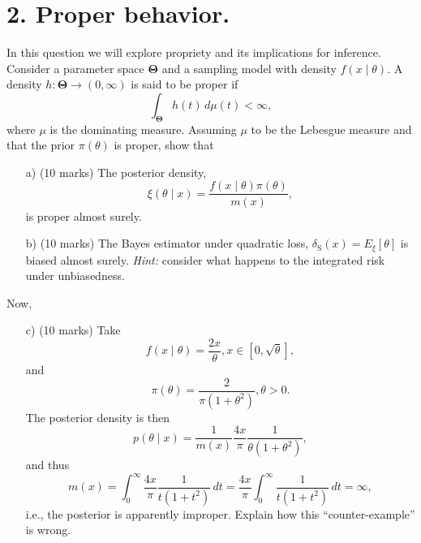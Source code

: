 \documentclass[a4paper,10pt, notitlepage]{report}
\begin{document}
\section*{2. Proper behavior.}

In this question we will explore propriety and its implications for inference.
Consider a parameter space $\boldsymbol{\Theta}$ and a sampling model with density $f(x \mid \theta)$.
A density $h : \boldsymbol{\Theta} \to (0, \infty)$ is said to be proper if 
\begin{equation*}
 \int_{\boldsymbol{\Theta}} h(t)\,d\mu(t)  < \infty,
\end{equation*}
where $\mu$ is the dominating measure.
Assuming $\mu$ to be the Lebesgue measure and that the prior $\pi(\theta)$ is proper, show that
\begin{itemize}
 \item[a)] (10 marks) The posterior density,
 \begin{equation*}
  \xi(\theta \mid x) = \frac{f(x\mid \theta)\pi(\theta)}{m(x)},
 \end{equation*}
is proper almost surely.



\item[b)] (10 marks) The Bayes estimator under quadratic loss, $\delta_{\text{S}}(x) = E_\xi[\theta]$ is biased almost surely.
\textit{Hint:} consider what happens to the integrated risk under
unbiasedness.



\end{itemize}
Now,
\begin{itemize}

 \item[c)] (10 marks) Take
$$f(x \mid \theta) = \frac{2x}{\theta}, x \in [0, \sqrt{\theta}],$$
and 
$$ \pi(\theta) = \frac{2}{\pi (1 +\theta^2)}, \theta > 0.$$
The posterior density is then
\begin{equation*}
 p(\theta \mid x) = \frac{1}{m(x)} \frac{4x}{\pi}\frac{1}{\theta(1 +\theta^2)},
\end{equation*}
 and thus
\begin{equation*}
 m(x) = \int_{0}^\infty \frac{4x}{\pi} \frac{1}{t(1 +t^2)}\,dt = \frac{4x}{\pi} \int_{0}^\infty \frac{1}{t(1 +t^2)}\,dt = \infty,
\end{equation*}
i.e., the posterior is apparently improper.
Explain how this ``counter-example'' is wrong.
\end{itemize}
\end{document}
